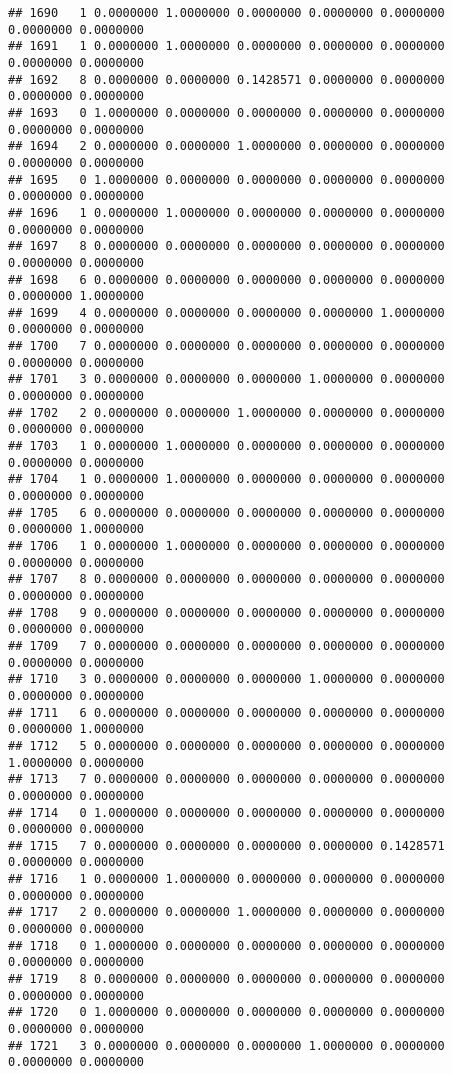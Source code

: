 \documentclass[
]{article}
\begin{document}
\begin{verbatim}
## 1690   1 0.0000000 1.0000000 0.0000000 0.0000000 0.0000000 0.0000000 0.0000000
## 1691   1 0.0000000 1.0000000 0.0000000 0.0000000 0.0000000 0.0000000 0.0000000
## 1692   8 0.0000000 0.0000000 0.1428571 0.0000000 0.0000000 0.0000000 0.0000000
## 1693   0 1.0000000 0.0000000 0.0000000 0.0000000 0.0000000 0.0000000 0.0000000
## 1694   2 0.0000000 0.0000000 1.0000000 0.0000000 0.0000000 0.0000000 0.0000000
## 1695   0 1.0000000 0.0000000 0.0000000 0.0000000 0.0000000 0.0000000 0.0000000
## 1696   1 0.0000000 1.0000000 0.0000000 0.0000000 0.0000000 0.0000000 0.0000000
## 1697   8 0.0000000 0.0000000 0.0000000 0.0000000 0.0000000 0.0000000 0.0000000
## 1698   6 0.0000000 0.0000000 0.0000000 0.0000000 0.0000000 0.0000000 1.0000000
## 1699   4 0.0000000 0.0000000 0.0000000 0.0000000 1.0000000 0.0000000 0.0000000
## 1700   7 0.0000000 0.0000000 0.0000000 0.0000000 0.0000000 0.0000000 0.0000000
## 1701   3 0.0000000 0.0000000 0.0000000 1.0000000 0.0000000 0.0000000 0.0000000
## 1702   2 0.0000000 0.0000000 1.0000000 0.0000000 0.0000000 0.0000000 0.0000000
## 1703   1 0.0000000 1.0000000 0.0000000 0.0000000 0.0000000 0.0000000 0.0000000
## 1704   1 0.0000000 1.0000000 0.0000000 0.0000000 0.0000000 0.0000000 0.0000000
## 1705   6 0.0000000 0.0000000 0.0000000 0.0000000 0.0000000 0.0000000 1.0000000
## 1706   1 0.0000000 1.0000000 0.0000000 0.0000000 0.0000000 0.0000000 0.0000000
## 1707   8 0.0000000 0.0000000 0.0000000 0.0000000 0.0000000 0.0000000 0.0000000
## 1708   9 0.0000000 0.0000000 0.0000000 0.0000000 0.0000000 0.0000000 0.0000000
## 1709   7 0.0000000 0.0000000 0.0000000 0.0000000 0.0000000 0.0000000 0.0000000
## 1710   3 0.0000000 0.0000000 0.0000000 1.0000000 0.0000000 0.0000000 0.0000000
## 1711   6 0.0000000 0.0000000 0.0000000 0.0000000 0.0000000 0.0000000 1.0000000
## 1712   5 0.0000000 0.0000000 0.0000000 0.0000000 0.0000000 1.0000000 0.0000000
## 1713   7 0.0000000 0.0000000 0.0000000 0.0000000 0.0000000 0.0000000 0.0000000
## 1714   0 1.0000000 0.0000000 0.0000000 0.0000000 0.0000000 0.0000000 0.0000000
## 1715   7 0.0000000 0.0000000 0.0000000 0.0000000 0.1428571 0.0000000 0.0000000
## 1716   1 0.0000000 1.0000000 0.0000000 0.0000000 0.0000000 0.0000000 0.0000000
## 1717   2 0.0000000 0.0000000 1.0000000 0.0000000 0.0000000 0.0000000 0.0000000
## 1718   0 1.0000000 0.0000000 0.0000000 0.0000000 0.0000000 0.0000000 0.0000000
## 1719   8 0.0000000 0.0000000 0.0000000 0.0000000 0.0000000 0.0000000 0.0000000
## 1720   0 1.0000000 0.0000000 0.0000000 0.0000000 0.0000000 0.0000000 0.0000000
## 1721   3 0.0000000 0.0000000 0.0000000 1.0000000 0.0000000 0.0000000 0.0000000

\end{verbatim}
\end{document}
